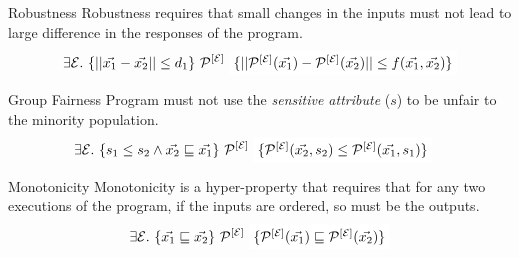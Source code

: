 \begin{frame}{Robustness}
    Robustness requires that small changes in the inputs must not lead to large difference in the responses of the program.
    \begin{align*}
        \exists \E. \ \{|| \vec{x_1} - \vec{x_2} || \leq d_1\} \ \proghole{}{\E} \ \colorbox{white}{$\{|| \proghole{}{\E}(\vec{x_1}) - \proghole{}{\E}(\vec{x_2}) || \leq f(\vec{x_1},\vec{x_2})\} $}
    \end{align*}
\end{frame}

\begin{frame}{Group Fairness}
    Program must not use the \textit{sensitive attribute} ($s$) to be unfair to the minority population.
    \begin{align*}
        \exists \E. \ \{{s_1} \leq {s_2} \land \vec{x_2} \sqsubseteq \vec{x_1}\} \ \proghole{}{\E} \ & \colorbox{white}{$\{\proghole{}{\E}(\vec{x_2}, {s_2}) \leq \proghole{}{\E}(\vec{x_1}, {s_1})\} $}
    \end{align*}
\end{frame}

\begin{frame}{Monotonicity}
    Monotonicity is a hyper-property that requires that for any two executions of the program, if the inputs are ordered, so must be the outputs.
    \begin{align*}
        \exists \E. \ \{\vec{x_1} \sqsubseteq \vec{x_2}\} \ \proghole{}{\E}\ \colorbox{white}{$\{ \proghole{}{\E}(\vec{x_1}) \sqsubseteq \proghole{}{\E}(\vec{x_2}) \}$}
    \end{align*}
\end{frame}